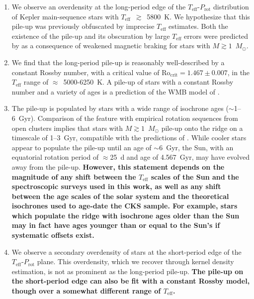 \documentclass[linenumbers,tighten,trackchanges,twocolumn]{aastex631}
\newcommand{\teff}{\ensuremath{T_{\mathrm{eff}}}\xspace}
\newcommand{\prot}{\ensuremath{P_\mathrm{rot}}\xspace}
\newcommand{\msun}{$M_\odot$\xspace}
\begin{document}
\begin{enumerate}
    \item We observe an overdensity at the long-period edge of the \teff-\prot distribution of Kepler main-sequence stars with \teff~$\gtrsim$~5800~K. We hypothesize that this pile-up was previously obfuscated by imprecise \teff estimates. Both the existence of the pile-up and its obscuration by large \teff errors were predicted by \citet{vanSaders2019} as a consequence of weakened magnetic braking for stars with $M\gtrsim1$~\msun. 
    
    \item We find that the long-period pile-up is reasonably well-described by a constant Rossby number, with a critical value of $\mathrm{Ro_{crit}=1.467 \pm 0.007}$, in the \teff range of $\approx$~5000-6250~K. A pile-up of stars with a constant Rossby number and a variety of ages is a prediction of the WMB model of \citet{vanSaders2016, vanSaders2019}.     

    \item The pile-up is populated by stars with a wide range of isochrone ages ($\sim$1--6~Gyr). Comparison of the feature with empirical rotation sequences from open clusters implies that stars with $M\gtrsim1$~\msun pile-up onto the ridge on a timescale of 1--3~Gyr, compatible with the predictions of \citet{vanSaders2019}. 
    While cooler stars appear to populate the pile-up until an age of $\sim$6~Gyr, the Sun, with an equatorial rotation period of $\approx$25~d and age of 4.567~Gyr, may have evolved away from the pile-up. \textbf{However, this statement depends on the magnitude of any shift between the \teff scales of the Sun and the spectroscopic surveys used in this work, as well as any shift between the age scales of the solar system and the theoretical isochrones used to age-date the CKS sample. For example, stars which populate the ridge with isochrone ages older than the Sun may in fact have ages younger than or equal to the Sun's if systematic offsets exist.}
    
    
    \item We observe a secondary overdensity of stars at the short-period edge of the \teff-\prot plane. This overdensity, which we recover through kernel density estimation, is not as prominent as the long-period pile-up. \textbf{The pile-up on the short-period edge can also be fit with a constant Rossby model, though over a somewhat different range of \teff. }
    

\end{enumerate}
\end{document}
